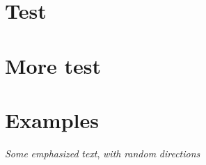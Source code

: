 \documentclass{article}
\begin{document}
\section{Test}

\section{More test}

\section{Examples}

\emph{Some} \emph{emphasized} \emph{text}, 
\emph{with} \emph{random} \emph{directions}
\end{document}
